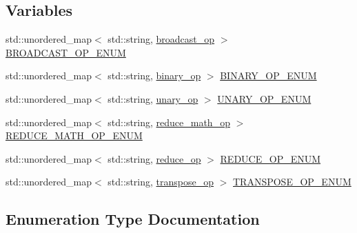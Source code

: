 \subsection*{Variables}
\begin{DoxyCompactItemize}
\item 
std\+::unordered\+\_\+map$<$ std\+::string, \hyperlink{namespacellk_1_1tensor__ops_ac43a7c3eb367c669baaa45a327aeca58}{broadcast\+\_\+op} $>$ \hyperlink{namespacellk_1_1tensor__ops_a309a5d53895adf0e1e1f4cad08533c95}{B\+R\+O\+A\+D\+C\+A\+S\+T\+\_\+\+O\+P\+\_\+\+E\+N\+UM}
\item 
std\+::unordered\+\_\+map$<$ std\+::string, \hyperlink{namespacellk_1_1tensor__ops_a255b8a4e49bc956c2731c62bf613c0f8}{binary\+\_\+op} $>$ \hyperlink{namespacellk_1_1tensor__ops_a523bf0b48b957ace6607a472ae9dda07}{B\+I\+N\+A\+R\+Y\+\_\+\+O\+P\+\_\+\+E\+N\+UM}
\item 
std\+::unordered\+\_\+map$<$ std\+::string, \hyperlink{namespacellk_1_1tensor__ops_a5fae70cbcf6cd7aadca4a04278614633}{unary\+\_\+op} $>$ \hyperlink{namespacellk_1_1tensor__ops_a1b8ad840d024cd3f488a6ab57dd3a36b}{U\+N\+A\+R\+Y\+\_\+\+O\+P\+\_\+\+E\+N\+UM}
\item 
std\+::unordered\+\_\+map$<$ std\+::string, \hyperlink{namespacellk_1_1tensor__ops_abbf479560e4c31bec0b83feb6531552c}{reduce\+\_\+math\+\_\+op} $>$ \hyperlink{namespacellk_1_1tensor__ops_a831660d7c372f4d5fa1e1a7cd81096f5}{R\+E\+D\+U\+C\+E\+\_\+\+M\+A\+T\+H\+\_\+\+O\+P\+\_\+\+E\+N\+UM}
\item 
std\+::unordered\+\_\+map$<$ std\+::string, \hyperlink{namespacellk_1_1tensor__ops_a57720b85adbe1e9b3bbab02b985f0d8d}{reduce\+\_\+op} $>$ \hyperlink{namespacellk_1_1tensor__ops_a1ba871d565798ea71360aae08174e879}{R\+E\+D\+U\+C\+E\+\_\+\+O\+P\+\_\+\+E\+N\+UM}
\item 
std\+::unordered\+\_\+map$<$ std\+::string, \hyperlink{namespacellk_1_1tensor__ops_a3a9aca203c5d38260a1dd35253d57ee8}{transpose\+\_\+op} $>$ \hyperlink{namespacellk_1_1tensor__ops_a699c757265f6f94f500fd25438919ffa}{T\+R\+A\+N\+S\+P\+O\+S\+E\+\_\+\+O\+P\+\_\+\+E\+N\+UM}
\end{DoxyCompactItemize}


\subsection{Enumeration Type Documentation}
\mbox{\label{namespacellk_1_1tensor__ops_a255b8a4e49bc956c2731c62bf613c0f8}} 
